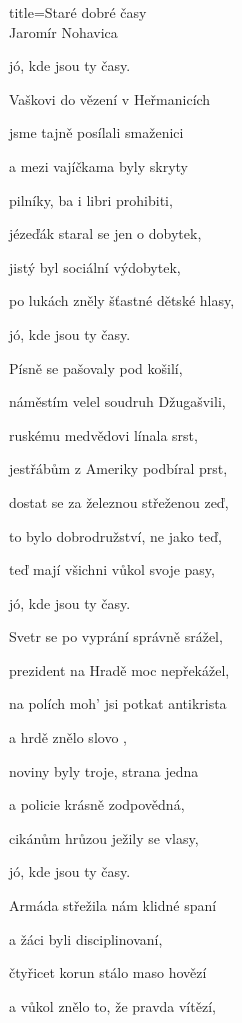 \begin{song}{title=\predtitle \centering Staré dobré časy \\\large Jaromír Nohavica }
{\begin{centerjustified}
\begin{varwidth}[t]{0.58\textwidth}
jó, kde jsou ty časy.


\end{varwidth}\begin{varwidth}[t]{0.48\textwidth}\setlength{\parindent}{\pindent}
\vspace*{0.405cm}  %

\sloka
Vaškovi do vězení v Heřmanicích

jsme tajně posílali smaženici

a mezi vajíčkama byly skryty

pilníky, ba i libri prohibiti,

jézeďák staral se jen o dobytek,

jistý byl sociální výdobytek,

po lukách zněly šťastné dětské hlasy,

jó, kde jsou ty časy.

\sloka
Písně se pašovaly pod košilí,

náměstím velel soudruh Džugašvili,

ruskému medvědovi línala srst,

jestřábům z Ameriky podbíral prst,

dostat se za železnou střeženou zeď,

to bylo dobrodružství, ne jako teď,

teď mají všichni vůkol svoje pasy,

jó, kde jsou ty časy.

\sloka
Svetr se po vyprání správně srážel,

prezident na Hradě moc nepřekážel,

na polích moh' jsi potkat antikrista

a hrdě znělo slovo ,

noviny byly troje, strana jedna

a policie krásně zodpovědná,

cikánům hrůzou ježily se vlasy,

jó, kde jsou ty časy.

\sloka
Armáda střežila nám klidné spaní

a žáci byli disciplinovaní,

čtyřicet korun stálo maso hovězí

a vůkol znělo to, že pravda vítězí,


\end{varwidth}
\end{centerjustified}}
\end{song}
